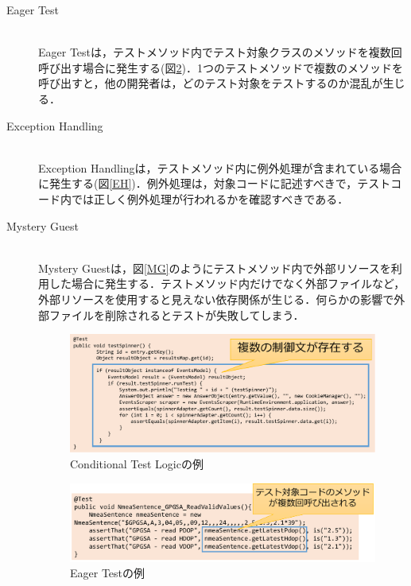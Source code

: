 \documentclass[12pt]{jarticle} %
\begin{document}
\begin{description}
\item[Eager Test]~\\
Eager Testは，テストメソッド内でテスト対象クラスのメソッドを複数回呼び出す場合に発生する(図\ref{ET})．1つのテストメソッドで複数のメソッドを呼び出すと，他の開発者は，どのテスト対象をテストするのか混乱が生じる．


\item[Exception Handling]~\\
Exception Handlingは，テストメソッド内に例外処理が含まれている場合に発生する(図\ref{EH})．例外処理は，対象コードに記述すべきで，テストコード内では正しく例外処理が行われるかを確認すべきである．

\item[Mystery Guest]~\\
Mystery Guestは，図\ref{MG}のようにテストメソッド内で外部リソースを利用した場合に発生する．テストメソッド内だけでなく外部ファイルなど，外部リソースを使用すると見えない依存関係が生じる．何らかの影響で外部ファイルを削除されるとテストが失敗してしまう．

\begin{figure}[htbp]
\begin{center}
\includegraphics[clip,width=15cm]{CTL.pdf}
\caption{Conditional Test Logicの例}
\label{CTL}
\end{center}
\end{figure}

\begin{figure}[htbp]
\begin{center}
\includegraphics[clip,width=15cm]{ET.pdf}
\caption{Eager Testの例}
\label{ET}
\end{center}
\end{figure}


\end{description}
\end{document}
